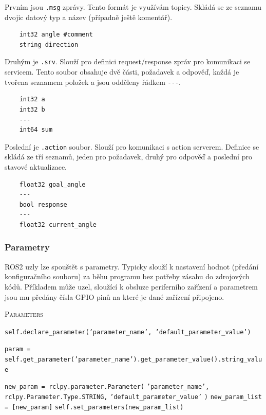Prvním jsou \verb|.msg| zprávy. Tento formát je využívám topicy. Skládá se ze seznamu dvojic datový typ a název (případně ještě komentář).
\begin{verbatim}
	int32 angle #comment
	string direction
\end{verbatim}

Druhým je \verb|.srv|. Slouží pro definici request/response zpráv pro komunikaci se servicem. Tento soubor obsahuje dvě části, požadavek a odpověď, každá je tvořena seznamem položek a jsou odděleny řádkem \verb|---|. 
\begin{verbatim}
	int32 a
	int32 b
	---
	int64 sum
\end{verbatim}

Poslední je \verb|.action| soubor. Slouží pro komunikaci s action serverem. Definice se skládá ze tří seznamů, jeden pro požadavek, druhý pro odpověď a poslední pro stavové aktualizace.
\begin{verbatim}
	float32 goal_angle
	---
	bool response
	---
	float32 current_angle
\end{verbatim}

\subsubsection*{Parametry} %
ROS2 uzly lze spouštět s parametry. Typicky slouží k nastavení hodnot (předání konfiguračního souboru) za běhu programu bez potřeby zásahu do zdrojových kódů. Příkladem může uzel, sloužící k obsluze periferního zařízení a parametrem jsou mu předány čísla GPIO pinů na které je dané zařízení připojeno.

\begin{algorithm}[h!]
	\label{}
	\caption{\textsc{Parameters}}
	
	\DontPrintSemicolon
	\SetAlgoNoLine
	\SetNlSty{}{}{:}
	\SetNlSkip{-1.1em}
	
	\BlankLine \Indp\Indpp
	
    \texttt{self.declare\_parameter('parameter\_name', 'default\_parameter\_value')}\;
	
	\BlankLine
	\texttt{param = self.get\_parameter('parameter\_name').get\_parameter\_value().string\_value}\;
	
	\BlankLine
	\texttt{new\_param = rclpy.parameter.Parameter(}\;
	\Indp\Indp
	\texttt{'parameter\_name',}\;
	\texttt{rclpy.Parameter.Type.STRING,}\;
	\texttt{'default\_parameter\_value'}\;
	\Indm\Indm
	\texttt{)}\;
	\texttt{new\_param\_list = [new\_param]}\;
	\texttt{self.set\_parameters(new\_param\_list)}\;

\end{algorithm}


